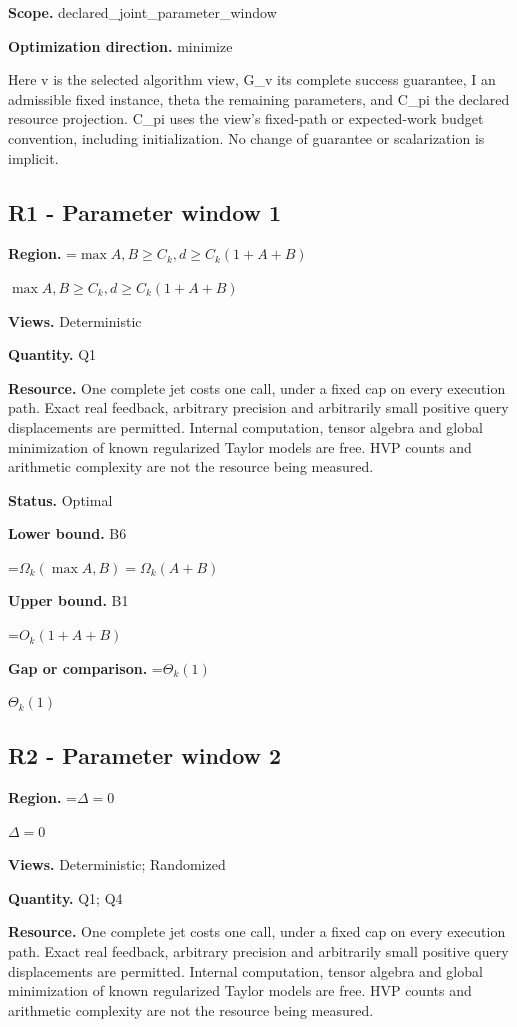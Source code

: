 \documentclass[10pt,a4paper]{article}
\newcommand{\AtlasMath}[1]{\par\begingroup\centering\setbox0=\hbox{$\displaystyle #1$}\ifdim\wd0>1.4\linewidth\typeout{ATLAS WIDE FORMULA: \the\wd0}\fi\ifdim\wd0>\linewidth\resizebox{\linewidth}{!}{\box0}\else\box0\fi\par\endgroup}
\newcommand{\AtlasInlineMath}[1]{\begingroup\setbox0=\hbox{$#1$}\ifdim\wd0>.4\linewidth\endgroup\AtlasMath{#1}\else\endgroup$#1$\fi}
\begin{document}
\textbf{Scope.} declared\_\allowbreak{}joint\_\allowbreak{}parameter\_\allowbreak{}window

\textbf{Optimization direction.} minimize

Here v is the selected algorithm view, G\_\allowbreak{}v its complete success guarantee, I an admissible fixed instance, theta the remaining parameters, and C\_\allowbreak{}pi the declared resource projection. C\_\allowbreak{}pi uses the view's fixed-path or expected-work budget convention, including initialization. No change of guarantee or scalarization is implicit.

\subsection{R1 - Parameter window 1}
\textbf{Region.} \AtlasInlineMath{\max{A,B}\ge C_k,d\ge C_k(1+A+B)}

\textbf{Views.} Deterministic

\textbf{Quantity.} Q1

\textbf{Resource.} One complete jet costs one call, under a fixed cap on every execution path. Exact real feedback, arbitrary precision and arbitrarily small positive query displacements are permitted. Internal computation, tensor algebra and global minimization of known regularized Taylor models are free. HVP counts and arithmetic complexity are not the resource being measured.

\textbf{Status.} Optimal

\textbf{Lower bound.} B6

\AtlasMath{\Omega_k(\max{A,B})=\Omega_k(A+B)}
\textbf{Upper bound.} B1

\AtlasMath{O_k(1+A+B)}
\textbf{Gap or comparison.} \AtlasInlineMath{\Theta_k(1)}

\subsection{R2 - Parameter window 2}
\textbf{Region.} \AtlasInlineMath{\Delta=0}

\textbf{Views.} Deterministic; Randomized

\textbf{Quantity.} Q1; Q4

\textbf{Resource.} One complete jet costs one call, under a fixed cap on every execution path. Exact real feedback, arbitrary precision and arbitrarily small positive query displacements are permitted. Internal computation, tensor algebra and global minimization of known regularized Taylor models are free. HVP counts and arithmetic complexity are not the resource being measured.
\end{document}
